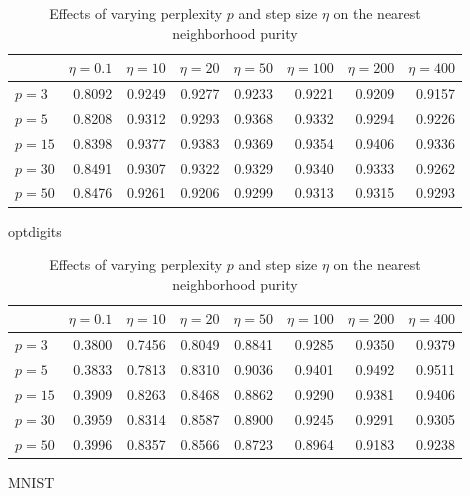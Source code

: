 \begin{table}[tb]
  \centering
  \begin{subtable}{\linewidth}
    \centering
  \begin{tabular}{lrrrrrrr}
    \toprule
& $\eta = 0.1$ & $\eta = 10$ & $\eta = 20$ & $\eta = 50$ & $\eta = 100$ & $\eta = 200$ & $\eta = 400$ \\ \midrule
$p = 3$ & \num{0.8092} & \num{0.9249} & \num{0.9277} & \num{0.9233} & \num{0.9221} & \num{0.9209} & \num{0.9157} \\
$p = 5$ & \num{0.8208} & \num{0.9312} & \num{0.9293} & \num{0.9368} & \num{0.9332} & \num{0.9294} & \num{0.9226} \\
$p = 15$ & \num{0.8398} & \num{0.9377} & \num{0.9383} & \num{0.9369} & \num{0.9354} & \num{0.9406} & \num{0.9336} \\
$p = 30$ & \num{0.8491} & \num{0.9307} & \num{0.9322} & \num{0.9329} & \num{0.9340} & \num{0.9333} & \num{0.9262} \\
$p = 50$ & \num{0.8476} & \num{0.9261} & \num{0.9206} & \num{0.9299} & \num{0.9313} & \num{0.9315} & \num{0.9293} \\
\bottomrule
\end{tabular}
  \caption{optdigits}
\end{subtable}
\par\bigskip
\begin{subtable}{\linewidth}
  \centering
  \begin{tabular}{lrrrrrrr}
    \toprule
& $\eta = 0.1$ & $\eta = 10$ & $\eta = 20$ & $\eta = 50$ & $\eta = 100$ & $\eta = 200$ & $\eta = 400$ \\ \midrule
$p = 3$ & \num{0.3800} & \num{0.7456} & \num{0.8049} & \num{0.8841} & \num{0.9285} & \num{0.9350} & \num{0.9379} \\
$p = 5$ & \num{0.3833} & \num{0.7813} & \num{0.8310} & \num{0.9036} & \num{0.9401} & \num{0.9492} & \num{0.9511} \\
$p = 15$ & \num{0.3909} & \num{0.8263} & \num{0.8468} & \num{0.8862} & \num{0.9290} & \num{0.9381} & \num{0.9406} \\
$p = 30$ & \num{0.3959} & \num{0.8314} & \num{0.8587} & \num{0.8900} & \num{0.9245} & \num{0.9291} & \num{0.9305} \\
$p = 50$ & \num{0.3996} & \num{0.8357} & \num{0.8566} & \num{0.8723} & \num{0.8964} & \num{0.9183} & \num{0.9238} \\
    \bottomrule
  \end{tabular}
  \caption{MNIST}
\end{subtable}
\caption{Effects of varying perplexity $p$ and step size $\eta$ on the nearest neighborhood purity}
  \label{tab:basic-params}
\end{table}

